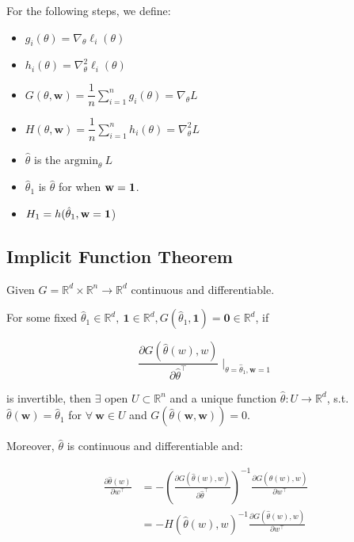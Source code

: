 \documentclass{article}
\begin{document}
For the following steps, we define:

\begin{itemize}
    \item $g_i (\theta) = \nabla_{\theta} \ell_i (\theta)$
    \item $h_i (\theta) = \nabla_{\theta}^2 \ell_i (\theta)$
    \item $G (\theta, \textbf{w}) = \dfrac{1}{n} \sum_{i = 1}^n g_i (\theta) = \nabla_{\theta} L$ 
    \item $H (\theta, \textbf{w}) = \dfrac{1}{n} \sum_{i = 1}^n h_i (\theta) = \nabla_{\theta}^2 L$
    \item $\hat{\theta}$ is the $\text{argmin}_{\theta} \ L$
    \item $\hat{\theta}_1$ is $\hat{\theta}$ for when $\textbf{w} = \bf{1}$.
    \item $H_1 =  h(\hat{\theta}_1, \textbf{w} = \bf{1}$)
\end{itemize}

\subsection*{Implicit Function Theorem}

Given $G = \mathbb{R}^d \times \mathbb{R}^n \to \mathbb{R}^d$ continuous and differentiable.

For some fixed $\hat{\theta}_1 \in \mathbb{R}^d, \ \textbf{1} \in \mathbb{R}^d, G(\hat{\theta}_1, \textbf{1}) = \textbf{0} \in \mathbb{R}^d$, if

$$
\frac{\partial G(\hat{\theta}(w), w)}{\partial \hat{\theta}^{\top}} \mid_{\theta = \hat{\theta}_1, \textbf{w} = 1}
$$

is invertible, then $\exists$ open $U \subset \mathbb{R}^n$ and a unique function $\hat{\theta}: U \to \mathbb{R}^d$, s.t. $\hat{\theta}(\textbf{w}) = \hat{\theta}_1$ for $\forall \ \textbf{w} \in U$ and $G(\hat{\theta}(\textbf{w}, \textbf{w})) = 0$.

Moreover, $\hat{\theta}$ is continuous and differentiable and:

\begin{align*}
    \frac{\partial \hat{\theta}(w)}{\partial w^{\top}} 
    &=
    - \left(
        \frac{\partial G(\hat{\theta}(w), w)}{\partial \hat{\theta}^{\top}}
    \right)^{-1}
    \frac{\partial G(\hat{\theta}(w), w)}{\partial w^{\top}} \\ 
    &=
    - H(\hat{\theta}(w), w)^{-1}
    \frac{\partial G(\hat{\theta}(w), w)}{\partial w^{\top}} \\ 
\end{align*}
\end{document}
